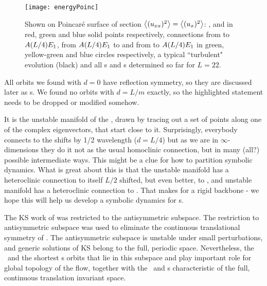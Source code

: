 
\begin{figure}
\begin{center}
    \texttt{[image: energyPoinc]}
\end{center}
\caption[Poincar\'{e} surface of section for L=22]
        {
Shown on Poincar\'{e} surface of section
$\left\langle {(u_{xx})^2} \right\rangle = \left\langle {(u_{x})^2} \right\rangle$:
,  and  in red, green and blue solid points respectively,
connections from  to $A(L/4)E_{1}$,
from $A(L/4)E_{1}$ to  and from  to $A(L/4)E_{1}$ in green,
yellow-green and blue circles respectively,
a typical ``turbulent" evolution (black) and all \po s and \rpo s
determined so far for $L=22$.
        }
\label{f:drivedragPoinc}
\end{figure}


{All orbits we found with $d = 0$ have reflection symmetry,
so they are discussed later as \po s.  We found no orbits with
$d = L/m$ exactly, so the highlighted statement needs to be dropped or
modified somehow.}

 It is the unstable manifold of the 
{\eqv}, drawn by tracing out a set of points along one of the complex
eigenvectors, that start close to it. Surprisingly, everybody connects
to the  shifts by 1/2 wavelength ($d = L/4$) but as we are in
$\infty$-dimensions they do it not as the usual homoclinic connection, but in
many (all?) possible intermediate ways. This might be a clue for how to
partition symbolic dynamics.
What is great about
this is that the  unstable manifold has a heteroclinic connection to itself
$L/2$ shifted, but
even better, to , and  unstable manifold has a heteroclinic
connection to .
That makes for a rigid backbone -
we hope this will help us develop a symbolic dynamics for \rpo s.

The KS work
of  was restricted to the
antisymmetric subspace. The restriction to antisymmetric
subspace was used to eliminate the continuous translational
symmetry of \KSe. The antisymmetric subspace is unstable
under small perturbations, and generic solutions of KS belong
to the full, periodic space. Nevertheless, the \eqva\ and the
shortest \po s orbits that lie in this subspace and play
important role for global topology of the flow, together with
the \reqva\ and \rpo s characteristic of the full, continuous
translation invariant space.

